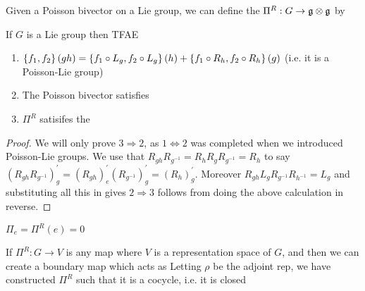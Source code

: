 \documentclass{article}
\begin{document}
\begin{definition}
Given a Poisson bivector on a Lie group, we can define the  $\Pi^R : G \to \mf{g} \otimes \mf{g}$ by 
\end{definition}

\begin{lemma}
If $G$ is a Lie group then TFAE 
\begin{enumerate}
    \item $\acomm[f_1]{f_2}(gh) = \acomm[f_1 \circ L_g]{f_2 \circ L_g}(h) + \acomm[f_1 \circ R_h]{f_2 \circ R_h}(g)$ (i.e. it is a Poisson-Lie group)
    \item The Poisson bivector satisfies 
    \item $\Pi^R$ satisifes the  
\end{enumerate}
\end{lemma}
\begin{proof}
We will only prove $3 \Rightarrow 2$, as $1 \Leftrightarrow 2$ was completed when we introduced Poisson-Lie groups. 
We use that $R_{gh}R_{g^{-1}} = R_h R_g R_{g^{-1}} = R_h $ to say $(R_{gh}R_{g^{-1}})^\prime_g = (R_{gh})^\prime_e (R_{g^{-1}})^\prime_g = (R_h)^\prime_g$. Moreover $R_{gh} L_g R_{g^{-1}} R_{h^{-1}} = L_g$ and substituting all this in gives 
$2 \Rightarrow 3$ follows from doing the above calculation in reverse. 
\end{proof}

\begin{corollary}
$\Pi_e = \Pi^R(e) = 0 $
\end{corollary}

\begin{aside}
If $\Pi^R : G \to V$ is any map where $V$ is a representation space of $G$, and then we can create a boundary map which acts as 
Letting $\rho$ be the adjoint rep, we have constructed $\Pi^R$ such that it is a cocycle, i.e. it is closed 
\end{aside}
\end{document}
